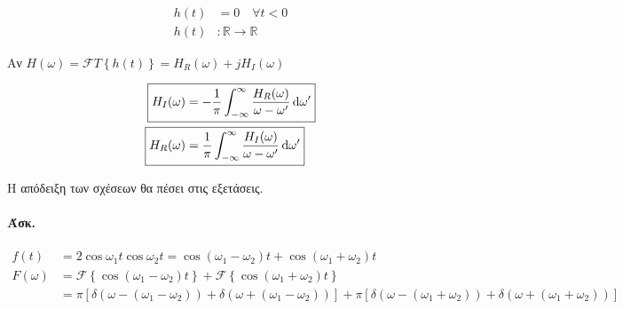      
     \paragraph{}
     \begin{align*}
     h(t) &= 0 \quad \forall t < 0 \\
     h(t)&: \mathbb R \to \mathbb R
     \end{align*}
    
    Αν \( H(\omega ) = \mathscr F T\left\lbrace h(t) \right\rbrace = H_R(\omega )
    +jH_I(\omega )
     \)
     
     \begin{align*}
     \Aboxed{ H_I(\omega ) &= -\frac{1}{\pi} \int_{-\infty}^{\infty}
     \frac{H_R(\omega)}{\omega -\omega'}\dif \omega ' } \\
     \Aboxed{ H_R(\omega ) &= \frac{1}{\pi} \int_{-\infty}^{\infty}
     \frac{H_I(\omega )}{\omega -\omega'}\dif \omega' }
     \end{align*}
     
     Η απόδειξη των σχέσεων θα πέσει στις εξετάσεις.
     
     \paragraph{Άσκ.}
     \begin{align*}
     f(t) &= 2\cos\omega_1 t \cos\omega_2 t = \cos(\omega_1-\omega_2)t
     +\cos(\omega_1+\omega_2)t
     \\ F(\omega ) &= \mathscr F\left\lbrace 
     \cos(\omega_1-\omega_2)t
      \right\rbrace + \mathscr F \left\lbrace \cos(\omega_1+\omega_2)t \right\rbrace
      \\ &=
      \pi \left[
      \delta\left( \omega -(\omega_1-\omega_2) \right)
      +\delta\left( \omega +(\omega_1-\omega_2) \right)
      \right] + \pi \left[
      \delta\left( \omega -(\omega_1+\omega_2) \right)
      +\delta\left( \omega +(\omega_1+\omega_2) \right)
      \right] 
     \end{align*}
     
